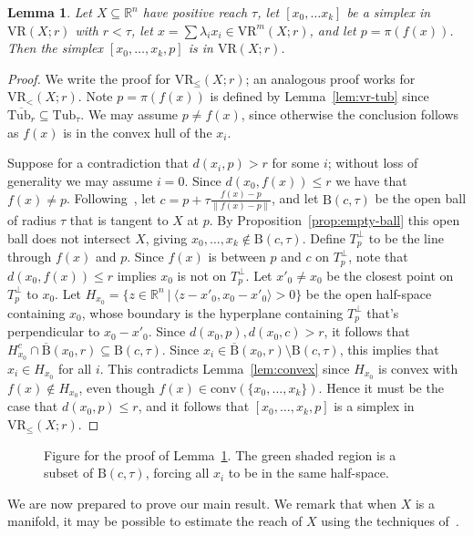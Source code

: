 \documentclass{amsart}
\theoremstyle{plain}
\newtheorem{lemma}{Lemma}[section]
\theoremstyle{definition}
\theoremstyle{myremark}
\newcommand{\R}{\mathbb{R}}
\newcommand{\conv}{\mathrm{conv}}
\newcommand{\ball}[2]{\mathrm{B}(#1,#2)}
\newcommand{\cball}[2]{\overline{\mathrm{B}}(#1,#2)}
\newcommand{\vr}[2]{\mathrm{VR}(#1;#2)}
\newcommand{\vrleq}[2]{\mathrm{VR}_\leq(#1;#2)}
\newcommand{\vrless}[2]{\mathrm{VR}_<(#1;#2)}
\newcommand{\vrm}[2]{\mathrm{VR}^m(#1;#2)}
\newcommand{\Tub}{\mathrm{Tub}}
\begin{document}
\begin{lemma}\label{lem:vr-simplex}
Let $X\subseteq\R^n$ have positive reach $\tau$, let $[x_0, \ldots x_k]$ be a simplex in $\vr{X}{r}$ with $r < \tau$, let $x = \sum \lambda_i x_i\in\vrm{X}{r}$, and let $p=\pi(f(x))$.
Then the simplex $[x_0 , \ldots , x_k , p]$ is in $\vr{X}{r}$.
\end{lemma}
\begin{proof}
We write the proof for $\vrleq{X}{r}$; an analogous proof works for $\vrless{X}{r}$. 
Note $p=\pi(f(x))$ is defined by Lemma~\ref{lem:vr-tub} since $\overline{\Tub_r}\subseteq \Tub_\tau$.
We may assume $p\neq f(x)$, since otherwise the conclusion follows as $f(x)$ is in the convex hull of the $x_i$.

Suppose for a contradiction that $d(x_i, p)> r$ for some $i$; without loss of generality we may assume $i=0$.
Since $d(x_0, f(x))\le r$ we have that $f(x)\neq p$.
Following~\cite{NiyogiSmaleWeinberger}, let $c=p+\tau\frac{f(x)-p}{\|f(x)-p\|}$, and let $\ball{c}{\tau}$ be the open ball of radius $\tau$ that is tangent to $X$ at $p$.
By Proposition~\ref{prop:empty-ball} this open ball does not intersect $X$, giving $x_0,\ldots,x_k\notin \ball{c}{\tau}$.
Define $T_p^{\perp}$ to be the line through $f(x)$ and $p$.
Since $f(x)$ is between $p$ and $c$ on $T_p^\perp$, note that $d(x_0, f(x))\le r$ implies $x_0$ is not on $T_p^\perp$.
Let $x'_0\neq x_0$ be the closest point on $T_p^\perp$ to $x_0$. Let $H_{x_0}=\{z\in\R^n~|~\langle z-x'_0,x_0-x'_0\rangle>0\}$ be the open half-space containing $x_0$, whose boundary is the hyperplane containing $T_p^\perp$ that's perpendicular to $x_0-x'_0$. 
Since $d(x_0, p),d(x_0,c)>r$, it follows that $H_{x_0}^c\cap \cball{x_0}{r}\subseteq \ball{c}{\tau}$.
Since $x_i\in \cball{x_0}{r}\setminus \ball{c}{\tau}$, this implies that $x_i\in H_{x_0}$ for all $i$.
This contradicts Lemma~\ref{lem:convex} since $H_{x_0}$ is convex with $f(x)\notin H_{x_0}$, even though $f(x)\in\conv(\{x_0,\ldots,x_k\})$.
Hence it must be the case that $d(x_0,p)\le r$, and it follows that $[x_0 , \ldots , x_k , p]$ is a simplex in $\vrleq{X}{r}$.
\end{proof}

\begin{figure}[h]
\def\svgwidth{3in}

\caption{Figure for the proof of Lemma~\ref{lem:vr-simplex}. The green shaded region is a subset of $\ball{c}{\tau}$, forcing all $x_i$ to be in the same half-space.}
\end{figure}

We are now prepared to prove our main result. We remark that when $X$ is a manifold, it may be possible to estimate the reach of $X$ using the techniques of~\cite{aamari2017estimating,attali2009stability,dey2006normal,fefferman2016testing}.
\end{document}
